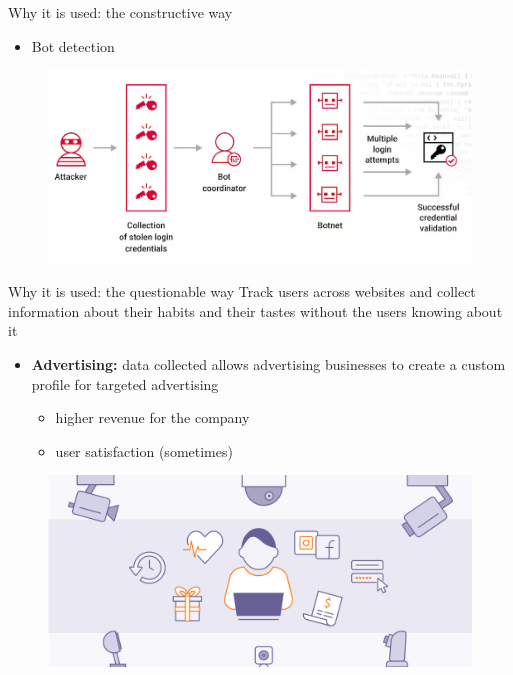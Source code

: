 \begin{frame}{Why it is used: the constructive way}
  \vspace{-0.5cm}
  \begin{itemize}
    \item Bot detection
  \end{itemize}
  \vspace{0.5cm}
  \begin{figure}
    \centering
    \includegraphics[width=0.9\linewidth]{images/botnet.png}
  \end{figure}
\end{frame}

\begin{frame}{Why it is used: the questionable way}
  Track users across websites and collect information about their habits and their tastes without the users knowing about it
  \vspace{0.5cm}
  \begin{itemize}
    \item \textbf{Advertising:} data collected allows advertising businesses to create a custom profile for targeted advertising
          \begin{itemize}
            \item higher revenue for the company
            \item user satisfaction (sometimes)
          \end{itemize}
  \end{itemize}
  \begin{figure}
    \centering
    \includegraphics[width=0.6\linewidth]{images/advertising.png}
  \end{figure}
\end{frame}


